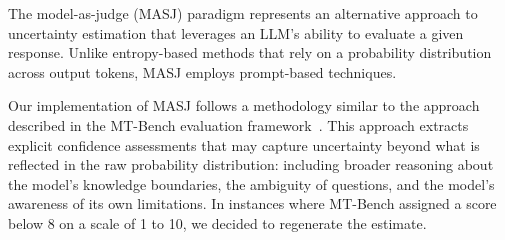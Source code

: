 The model-as-judge (MASJ) paradigm represents an alternative approach to uncertainty estimation that leverages an LLM's ability to evaluate a given response. 
Unlike entropy-based methods that rely on a probability distribution across output tokens, MASJ employs prompt-based techniques.

Our implementation of MASJ follows a methodology similar to the approach described in the MT-Bench evaluation framework~\cite{zheng2023judging}. This approach extracts explicit confidence assessments that may capture uncertainty beyond what is reflected in the raw probability distribution: including broader reasoning about the model's knowledge boundaries, the ambiguity of questions, and the model's awareness of its own limitations. In instances where MT-Bench assigned a score below 8 on a scale of 1 to 10, we decided to regenerate the estimate.